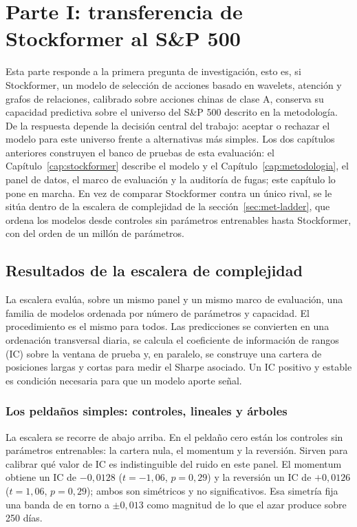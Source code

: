 \chapter{Parte I: transferencia de Stockformer al S\&P 500}\label{cap:parte1}

Esta parte responde a la primera pregunta de investigación, esto es, si Stockformer, un modelo de
selección de acciones basado en wavelets, atención y grafos de relaciones, calibrado sobre
acciones chinas de clase A, conserva su capacidad predictiva sobre el universo del S\&P
500 descrito en la metodología. De la respuesta depende la decisión central del trabajo:
aceptar o rechazar el modelo para este universo frente a alternativas más simples. Los dos
capítulos anteriores construyen el banco de pruebas de esta evaluación: el
Capítulo~\ref{cap:stockformer} describe el modelo y el Capítulo~\ref{cap:metodologia}, el
panel de datos, el marco de evaluación y la auditoría de fugas; este capítulo lo pone en
marcha. En vez de comparar Stockformer contra un único rival, se
le sitúa dentro de la escalera de complejidad de la sección~\ref{sec:met-ladder}, que
ordena los modelos desde controles sin parámetros entrenables hasta Stockformer, con del
orden de un millón de parámetros.

\section{Resultados de la escalera de complejidad}\label{sec:p1-ladder}

La escalera evalúa, sobre un mismo panel y un mismo marco de evaluación, una familia de
modelos ordenada por número de parámetros y capacidad. El procedimiento es el mismo para
todos. Las predicciones se convierten en una ordenación transversal diaria, se calcula el
coeficiente de información de rangos (IC) sobre la ventana de prueba y, en paralelo, se
construye una cartera de posiciones largas y cortas para medir el Sharpe asociado. Un IC
positivo y estable es condición necesaria para que un modelo aporte señal. 



\subsection{Los peldaños simples: controles, lineales y árboles}\label{sec:p1-simples}

La escalera se recorre de abajo arriba. En el peldaño cero están los controles sin
parámetros entrenables: la cartera nula, el momentum y la reversión. Sirven para calibrar
qué valor de IC es indistinguible del ruido en este panel. El momentum obtiene un IC de
$-0{,}0128$ ($t=-1{,}06$, $p=0{,}29$) y la reversión un IC de $+0{,}0126$ ($t=1{,}06$,
$p=0{,}29$); ambos son simétricos y no significativos. Esa simetría fija una banda de
en torno a $\pm 0{,}013$ como magnitud de lo que el azar produce sobre 250 días.

